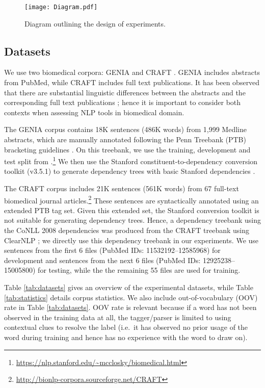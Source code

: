 \documentclass[twocolumn,hyperref]{bmcart}\pdfoutput=1
\newcommand{\CHANGEA}[1]{#1}
\begin{document}
\begin{figure}[t]
    \centering
    \texttt{[image: Diagram.pdf]}
    \caption{\CHANGEA{Diagram outlining the design of experiments.}}
    \label{fig:Diagram}
\end{figure}

\subsection*{Datasets}

We use two biomedical corpora: GENIA \cite{I05-2038} and CRAFT \cite{Verspoor2012}. GENIA includes abstracts from PubMed, while CRAFT includes full text publications. It has been observed that there are substantial linguistic differences between the abstracts and the corresponding full text publications
\cite{cohen2010structural}; hence it is important to consider both contexts when assessing  NLP tools in biomedical domain.

The GENIA corpus contains 18K sentences ({}486K words) from 1,999 Medline abstracts, which are manually annotated following the Penn Treebank (PTB) bracketing guidelines \cite{I05-2038}.  
On this  treebank, we use the training, development and test split from \cite{david2010}.\footnote{{\url{https://nlp.stanford.edu/~mcclosky/biomedical.html}}}   
We then use  the Stanford constituent-to-dependency conversion toolkit (v3.5.1) to  generate dependency trees with basic Stanford dependencies \cite{deMarneffe:2008:STD:1608858.1608859}.   

The CRAFT corpus includes 21K sentences ({}561K words) from 67 full-text biomedical journal articles.\footnote{\url{http://bionlp-corpora.sourceforge.net/CRAFT}} These sentences are   syntactically annotated using an extended PTB tag set.
Given this extended set, the Stanford conversion toolkit is not  suitable for generating dependency trees. Hence,
a dependency treebank using the CoNLL 2008 dependencies \cite{surdeanu-EtAl:2008:CONLL} was produced from the CRAFT treebank using ClearNLP \cite{Choi2012}; we directly use this dependency treebank in our experiments. We use sentences from the first 6 files (PubMed IDs: 11532192--12585968) for development and sentences from the next 6  files (PubMed IDs: 12925238--15005800) for testing, while the the remaining 55 files are used for training.   

Table  \ref{tab:datasets} gives an overview of the experimental datasets, while  Table  \ref{tab:statistics} details corpus statistics.  \CHANGEA{We also include out-of-vocabulary (OOV)  rate in Table \ref{tab:datasets}. OOV rate is relevant because if a
word has not been observed in the training data at all, the tagger/parser is limited to
using contextual clues to resolve the label (i.e.\ it has observed no prior usage
of the word during training and hence has no experience with the word to
draw on).}
\end{document}
